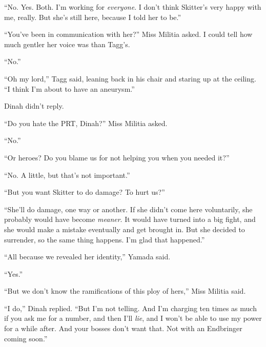``No.  Yes.  Both.  I'm working for \emph{everyone}.  I don't think Skitter's very happy with me, really.  But she's still here, because I told her to be.''



``You've been in communication with her?'' Miss Militia asked.  I could tell how much gentler her voice was than Tagg's.



``No.''



``Oh my lord,'' Tagg said, leaning back in his chair and staring up at the ceiling.  ``I think I'm about to have an aneurysm.''



Dinah didn't reply.



``Do you hate the PRT, Dinah?'' Miss Militia asked.



``No.''



``Or heroes?  Do you blame us for not helping you when you needed it?''



``No.  A little, but that's not important.''



``But you want Skitter to do damage?  To hurt us?''



``She'll do damage, one way or another.  If she didn't come here voluntarily, she probably would have become \emph{meaner}.  It would have turned into a big fight, and she would make a mistake eventually and get brought in.  But she decided to surrender, so the same thing happens.  I'm glad that happened.''



``All because we revealed her identity,'' Yamada said.



``Yes.''



``But we don't know the ramifications of this ploy of hers,'' Miss Militia said.



``I do,'' Dinah replied.  ``But I'm not telling.  And I'm charging ten times as much if you ask me for a number, and then I'll \emph{lie}, and I won't be able to use my power for a while after.  And your bosses don't want that.  Not with an Endbringer coming soon.''



